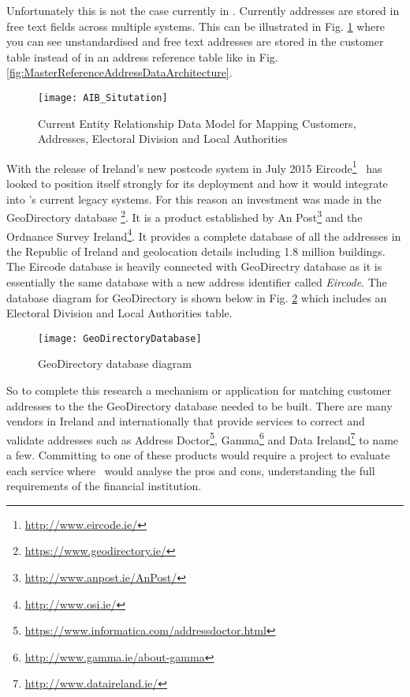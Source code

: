 Unfortunately this is not the case currently in \subjectname. Currently addresses are stored in free text fields across multiple systems. This can be illustrated in Fig. \ref{fig:AIB_Situtation} where you can see unstandardised and free text addresses are stored in the customer table instead of in an address reference table like in Fig. \ref{fig:MasterReferenceAddressDataArchitecture}.

\begin{figure}[H]
	\texttt{[image: AIB\_Situtation]}
	\caption{Current Entity Relationship Data Model for Mapping Customers, Addresses, Electoral Division and Local Authorities}
	\label{fig:AIB_Situtation}
\end{figure}

With the release of Ireland's new postcode system in July 2015 Eircode\footnote{\url{http://www.eircode.ie/}} \subjectname\ has looked to position itself strongly for its deployment and how it would integrate into \subjectname's current legacy systems. For this reason an investment was made in the GeoDirectory database \footnote{\url{https://www.geodirectory.ie/}}. It is a product established by An Post\footnote{\url{http://www.anpost.ie/AnPost/}} and the Ordnance Survey Ireland\footnote{\url{http://www.osi.ie/}}. It provides a complete database of all the addresses in the Republic of Ireland and geolocation details including 1.8 million buildings. The Eircode database is heavily connected with GeoDirectry database as it is essentially the same database with a new address identifier called \textit{Eircode}. The database diagram for GeoDirectory is shown below in Fig. \ref{fig:GeoDirectoryDatabase} which includes an Electoral Division and Local Authorities table.

\begin{figure}[H]
	\texttt{[image: GeoDirectoryDatabase]}
	\caption{GeoDirectory database diagram}
	\label{fig:GeoDirectoryDatabase}
\end{figure}

So to complete this research a mechanism or application for matching customer addresses to the the GeoDirectory database needed to be built. There are many vendors in Ireland and internationally that provide services to correct and validate addresses such as Address Doctor\footnote{\url{https://www.informatica.com/addressdoctor.html}}, Gamma\footnote{\url{http://www.gamma.ie/about-gamma}} and Data Ireland\footnote{\url{http://www.dataireland.ie/}} to name a few. Committing to one of these products would require a project to evaluate each service where \subjectname\ would analyse the pros and cons, understanding the full requirements of the financial institution.


